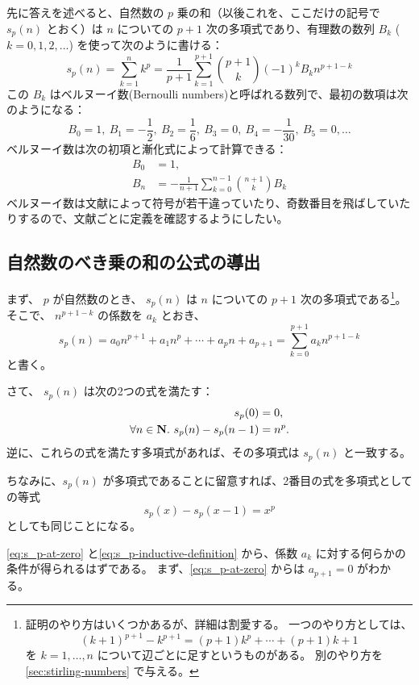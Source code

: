 {先に答えを述べると、自然数の $p$ 乗の和（以後これを、ここだけの記号で $s_p(n)$ とおく）は $n$ についての $p+1$ 次の多項式であり、有理数の数列 $B_k$ ($k=0,1,2,\dotsc$) を使って次のように書ける：
\[
  s_p(n)=\sum_{k=1}^n k^p=\frac{1}{p+1}\sum_{k=1}^{p+1} \binom{p+1}{k} (-1)^k B_k n^{p+1-k}
\]
この $B_k$ はベルヌーイ数(Bernoulli numbers)と呼ばれる数列で、最初の数項は次のようになる：
\[
  B_0=1,\
  B_1=-\frac12,\
  B_2=\frac16,\
  B_3=0,\
  B_4=-\frac{1}{30},\
  B_5=0,\dotsc
\]
ベルヌーイ数は次の初項と漸化式によって計算できる：
\begin{align*}
  B_0&=1, \\
  B_n&=-\frac{1}{n+1}\sum_{k=0}^{n-1} \binom{n+1}{k} B_k
\end{align*}
ベルヌーイ数は文献によって符号が若干違っていたり、奇数番目を飛ばしていたりするので、文献ごとに定義を確認するようにしたい。

\subsection{自然数のべき乗の和の公式の導出}
まず、 $p$ が自然数のとき、 $s_p(n)$ は $n$ についての $p+1$ 次の多項式である\footnote{%
証明のやり方はいくつかあるが、詳細は割愛する。
一つのやり方としては、
\[(k+1)^{p+1}-k^{p+1}=(p+1)k^p+\dotsb+(p+1)k+1\]
を $k=1,\dotsc,n$ について辺ごとに足すというものがある。
別のやり方を\ref{sec:stirling-numbers} で与える。
}。
そこで、 $n^{p+1-k}$ の係数を $a_k$ とおき、
\[
  s_p(n)
  =a_0 n^{p+1}+a_1 n^p+\dotsb+a_{p} n+a_{p+1}
  =\sum_{k=0}^{p+1} a_k n^{p+1-k}
\]
と書く。

さて、 $s_p(n)$ は次の2つの式を満たす：
\begin{align}
  s_p(0)&=0, \label{eq:s_p-at-zero} \\
  \forall n\in\Natural.\ s_p(n)-s_p(n-1)&=n^p. \label{eq:s_p-inductive-definition}
\end{align}
逆に、これらの式を満たす多項式があれば、その多項式は $s_p(n)$ と一致する。

ちなみに、$s_p(n)$ が多項式であることに留意すれば、2番目の式を多項式としての等式
\begin{equation*}
  s_p(x)-s_p(x-1)=x^p
\end{equation*}
としても同じことになる。

\autoref{eq:s_p-at-zero} と\autoref{eq:s_p-inductive-definition} から、係数 $a_k$ に対する何らかの条件が得られるはずである。
まず、\autoref{eq:s_p-at-zero} からは $a_{p+1}=0$ がわかる。

}
